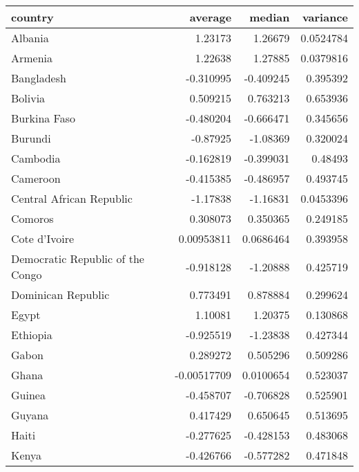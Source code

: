 \documentclass{article}
\begin{document}
\begin{table}[]
\begin{tabular}{lrrr}
\toprule
 country                          &     average &     median &   variance \\
\midrule
 Albania                          &  1.23173    &  1.26679   &  0.0524784 \\
 Armenia                          &  1.22638    &  1.27885   &  0.0379816 \\
 Bangladesh                       & -0.310995   & -0.409245  &  0.395392  \\
 Bolivia                          &  0.509215   &  0.763213  &  0.653936  \\
 Burkina Faso                     & -0.480204   & -0.666471  &  0.345656  \\
 Burundi                          & -0.87925    & -1.08369   &  0.320024  \\
 Cambodia                         & -0.162819   & -0.399031  &  0.48493   \\
 Cameroon                         & -0.415385   & -0.486957  &  0.493745  \\
 Central African Republic         & -1.17838    & -1.16831   &  0.0453396 \\
 Comoros                          &  0.308073   &  0.350365  &  0.249185  \\
 Cote d'Ivoire                    &  0.00953811 &  0.0686464 &  0.393958  \\
 Democratic Republic of the Congo & -0.918128   & -1.20888   &  0.425719  \\
 Dominican Republic               &  0.773491   &  0.878884  &  0.299624  \\
 Egypt                            &  1.10081    &  1.20375   &  0.130868  \\
 Ethiopia                         & -0.925519   & -1.23838   &  0.427344  \\
 Gabon                            &  0.289272   &  0.505296  &  0.509286  \\
 Ghana                            & -0.00517709 &  0.0100654 &  0.523037  \\
 Guinea                           & -0.458707   & -0.706828  &  0.525901  \\
 Guyana                           &  0.417429   &  0.650645  &  0.513695  \\
 Haiti                            & -0.277625   & -0.428153  &  0.483068  \\
 Kenya                            & -0.426766   & -0.577282  &  0.471848  \\

\end{tabular}
\end{table}
\end{document}

